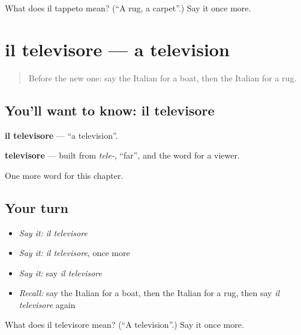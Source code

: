 \begin{tcolorbox}[breakable,colback=teal!4,colframe=teal!35!black,title={Before you move on}]
What does il tappeto mean? (\textquotedblleft{}A rug, a carpet\textquotedblright{}.) Say it once more.
\end{tcolorbox}
\section[il televisore]{il televisore — a television}

\label{lesson:IT-C94-televisore}



\begin{quote}
Before the new one: say the Italian for a boat, then the Italian for a rug.
\end{quote}

\subsection*{You'll want to know: il televisore}
\textbf{il televisore} — \textquotedblleft{}a television\textquotedblright{}.

\begin{cousinweb}
\textbf{televisore} — built from \emph{tele-}, \textquotedblleft{}far\textquotedblright{}, and the word for a viewer.
\end{cousinweb}

\begin{grammarlens}[title={What you've built}]
One more word for this chapter.
\end{grammarlens}

\subsection*{Your turn}
\begin{itemize}
\raggedright
  \item \emph{Say it:} \emph{il televisore}
  \item \emph{Say it:} \emph{il televisore}, once more
  \item \emph{Say it:} say \emph{il televisore}
  \item \emph{Recall:} say the Italian for a boat, then the Italian for a rug, then say \emph{il televisore} again
\end{itemize}

\begin{tcolorbox}[breakable,colback=teal!4,colframe=teal!35!black,title={Before you move on}]
What does il televisore mean? (\textquotedblleft{}A television\textquotedblright{}.) Say it once more.
\end{tcolorbox}
